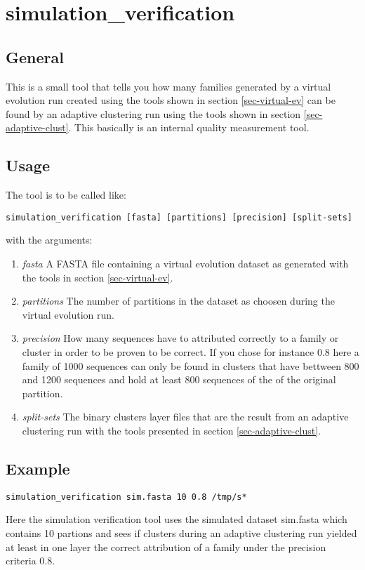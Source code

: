 \section{simulation\_verification}

\subsection{General}

This is a small tool that tells you how many families generated by a virtual
evolution run created using the tools shown in section
\ref{sec-virtual-ev} can be found by an adaptive clustering run using
the tools shown in section \ref{sec-adaptive-clust}. This basically is
an internal quality measurement tool.

\subsection{Usage}

The tool is to be called like:

\begin{lstlisting}
simulation_verification [fasta] [partitions] [precision] [split-sets]
\end{lstlisting}
with the arguments:
\begin{enumerate}
  \item \emph{fasta} A FASTA file containing a virtual evolution
    dataset as generated with the tools in section
    \ref{sec-virtual-ev}.
  \item \emph{partitions} The number of partitions in the dataset as
    choosen during the virtual evolution run.
  \item \emph{precision} How many sequences have to attributed
    correctly to a family or cluster in order to be proven to be
    correct. If you chose for instance 0.8 here a family of 1000
    sequences can only be found in clusters that have bettween 800 and
    1200 sequences and hold at least 800 sequences of the of the
    original partition. 
  \item \emph{split-sets} The binary clusters layer files that are the
    result from an adaptive clustering run with the tools presented in
    section \ref{sec-adaptive-clust}.
\end{enumerate}

\subsection{Example}
\begin{lstlisting}
simulation_verification sim.fasta 10 0.8 /tmp/s*
\end{lstlisting}
Here the simulation verification tool uses the simulated dataset
sim.fasta which contains 10 partions and sees if clusters during an
adaptive clustering run yielded at least in one layer the correct
attribution of a family under the precision criteria 0.8.

